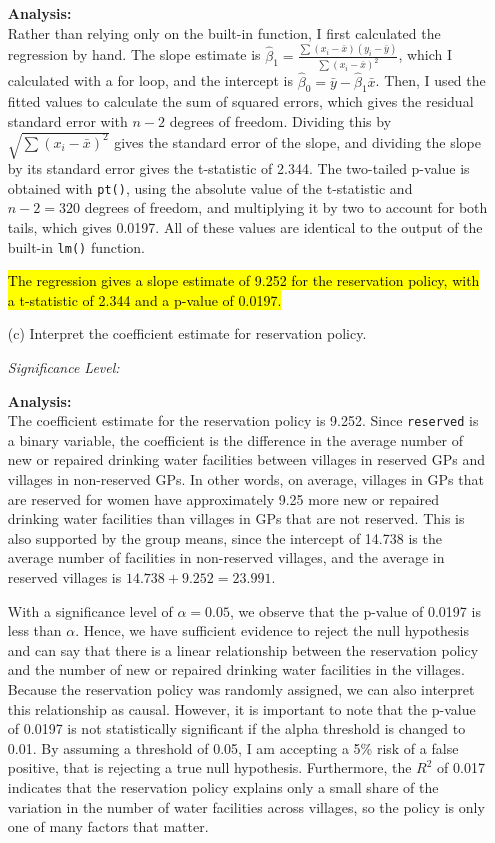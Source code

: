 \documentclass[12pt,letterpaper]{article}
\begin{document}
\begin{enumerate}
	\textbf{Analysis:}\\
	Rather than relying only on the built-in function, I first calculated the regression by hand. The slope estimate is $\hat{\beta}_1 = \frac{\sum (x_i - \bar{x})(y_i - \bar{y})}{\sum (x_i - \bar{x})^2}$, which I calculated with a for loop, and the intercept is $\hat{\beta}_0 = \bar{y} - \hat{\beta}_1 \bar{x}$. Then, I used the fitted values to calculate the sum of squared errors, which gives the residual standard error with $n-2$ degrees of freedom. Dividing this by $\sqrt{\sum (x_i - \bar{x})^2}$ gives the standard error of the slope, and dividing the slope by its standard error gives the t-statistic of 2.344. The two-tailed p-value is obtained with \texttt{pt()}, using the absolute value of the t-statistic and $n-2 = 320$ degrees of freedom, and multiplying it by two to account for both tails, which gives 0.0197. All of these values are identical to the output of the built-in \texttt{lm()} function.
	
	\hl{The regression gives a slope estimate of 9.252 for the reservation policy, with a t-statistic of 2.344 and a p-value of 0.0197.}
	
	
	\vspace{.5cm}
	
	\item [(c)] Interpret the coefficient estimate for reservation policy. 
	
	\textit{Significance Level:}
	
	
	\textbf{Analysis:}\\
	The coefficient estimate for the reservation policy is 9.252. Since \texttt{reserved} is a binary variable, the coefficient is the difference in the average number of new or repaired drinking water facilities between villages in reserved GPs and villages in non-reserved GPs. In other words, on average, villages in GPs that are reserved for women have approximately 9.25 more new or repaired drinking water facilities than villages in GPs that are not reserved. This is also supported by the group means, since the intercept of 14.738 is the average number of facilities in non-reserved villages, and the average in reserved villages is $14.738 + 9.252 = 23.991$.
	
	With a significance level of $\alpha = 0.05$, we observe that the p-value of 0.0197 is less than $\alpha$. Hence, we have sufficient evidence to reject the null hypothesis and can say that there is a linear relationship between the reservation policy and the number of new or repaired drinking water facilities in the villages. Because the reservation policy was randomly assigned, we can also interpret this relationship as causal. However, it is important to note that the p-value of 0.0197 is not statistically significant if the alpha threshold is changed to 0.01. By assuming a threshold of 0.05, I am accepting a 5\% risk of a false positive, that is rejecting a true null hypothesis. Furthermore, the $R^2$ of 0.017 indicates that the reservation policy explains only a small share of the variation in the number of water facilities across villages, so the policy is only one of many factors that matter.
	

\end{enumerate}
\end{document}
